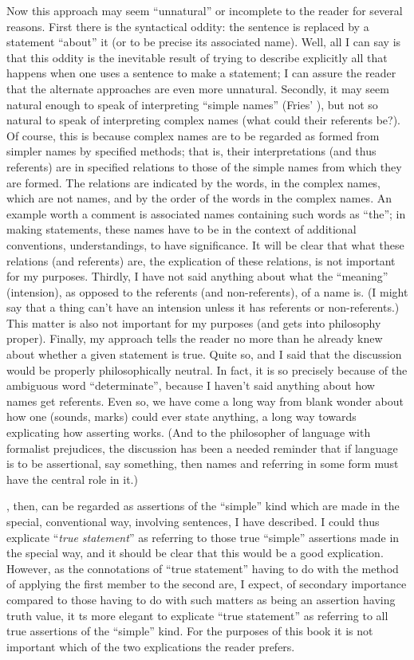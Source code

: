 Now this approach may seem \enquote{unnatural} or incomplete to the reader for several reasons. First there is the syntactical oddity: the sentence is replaced by a statement \enquote{about} it (or to be precise its associated name). Well, all I can say is that this oddity is the inevitable result of trying to describe explicitly all that happens when one uses a sentence to make a statement; I can assure the reader that the alternate approaches are even more unnatural. Secondly, it may seem natural enough to speak of interpreting \enquote{simple names} (Fries' ), but not so natural to speak of interpreting complex names (what could their referents be?). Of course, this is because complex names are to be regarded as formed from simpler names by specified methods; that is, their interpretations (and thus referents) are in specified relations to those of the simple names from which they are formed. The relations are indicated by the words, in the complex names, which are not names, and by the order of the words in the complex names. An example worth a comment is associated names containing such words as \enquote{the}; in making statements, these names have to be in the context of additional conventions, understandings, to have significance. It will be clear that what these relations (and referents) are, the explication of these relations, is not important for my purposes. Thirdly, I have not said anything about what the \enquote{meaning} (intension), as opposed to the referents (and non-referents), of a name is. (I might say that a thing can't have an intension unless it has referents or non-referents.) This matter is also not important for my purposes (and gets into philosophy proper). Finally, my approach tells the reader no more than he already knew about whether a given statement is true. Quite so, and I said that the discussion would be properly philosophically neutral. In fact, it is so precisely because of the ambiguous word \enquote{determinate}, because I haven't said anything about how names get referents. Even so, we have come a long way from blank wonder about how one (sounds, marks) could ever state anything, a long way towards explicating how asserting works. (And to the philosopher of language with formalist prejudices, the discussion has been a needed reminder that if language is to be assertional, say something, then names and referring in some form must have the central role in it.) 

, then, can be regarded as assertions of the \enquote{simple} kind which are made in the special, conventional way, involving sentences, I have described. I could thus explicate \enquote{\emph{true statement}} as referring to those true \enquote{simple} assertions made in the special way, and it should be clear that this would be a good explication. However, as the connotations of \enquote{true statement} having to do with the method of applying the first member to the second are, I expect, of secondary importance compared to those having to do with such matters as being an assertion having truth value, it ts more elegant to explicate \enquote{true statement} as referring to all true assertions of the \enquote{simple} kind. For the purposes of this book it is not important which of the two explications the reader prefers. 

